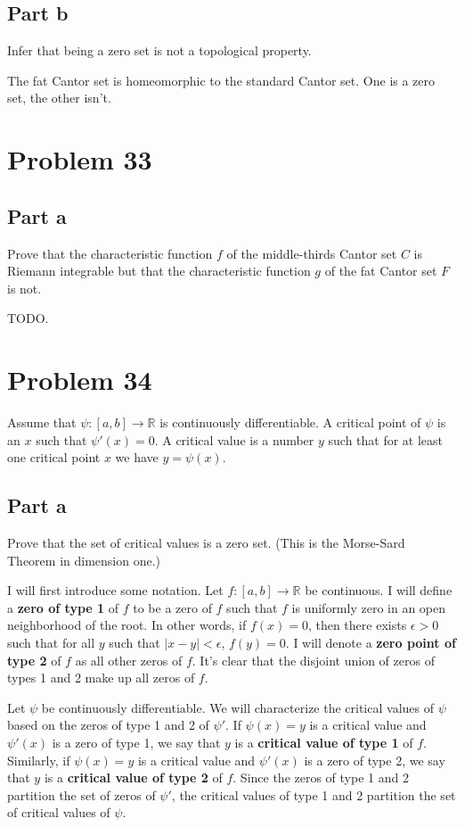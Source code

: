 \documentclass{article}
\newcommand{\R}{\mathbb{R}}
\begin{document}
\subsection*{Part b}

Infer that being a zero set is not a topological property.

The fat Cantor set is homeomorphic to the standard Cantor set. One is a zero set, the other isn't.

\section*{Problem 33}

\subsection*{Part a}

Prove that the characteristic function $f$ of the middle-thirds Cantor set $C$ is Riemann integrable but that the characteristic function $g$ of the fat Cantor set $F$ is not.

TODO. 

\section*{Problem 34}

Assume that $\psi: [a, b] \rightarrow \R$ is continuously differentiable. A critical point of $\psi$ is an $x$ such that $\psi'(x) = 0$. A critical value is a number $y$ such that for at least one critical point $x$ we have $y = \psi(x)$.

\subsection*{Part a}

Prove that the set of critical values is a zero set. (This is the Morse-Sard Theorem in dimension one.)

I will first introduce some notation. Let $f: [a, b] \rightarrow \R$ be continuous. I will define a \textbf{zero of type 1} of $f$ to be a zero of $f$ such that $f$ is uniformly zero in an open neighborhood of the root. In other words, if $f(x) = 0$, then there exists $\epsilon > 0$ such that for all $y$ such that $|x-y| < \epsilon$, $f(y) = 0$. I will denote a \textbf{zero point of type 2} of $f$ as all other zeros of $f$. It's clear that the disjoint union of zeros of types 1 and 2 make up all zeros of $f$.

Let $\psi$ be continuously differentiable. We will characterize the critical values of $\psi$ based on the zeros of type 1 and 2 of $\psi'$. If $\psi(x) = y$ is a critical value and $\psi'(x)$ is a zero of type 1, we say that $y$ is a \textbf{critical value of type 1} of $f$. Similarly, if $\psi(x) = y$ is a critical value and $\psi'(x)$ is a zero of type 2, we say that $y$ is a \textbf{critical value of type 2} of $f$. Since the zeros of type 1 and 2 partition the set of zeros of $\psi'$, the critical values of type 1 and 2 partition the set of critical values of $\psi$.
\end{document}
